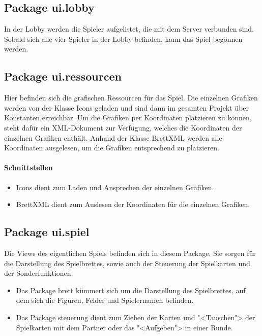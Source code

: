\documentclass[12pt,halfparskip]{scrartcl}
\begin{document}
\subsection{Package ui.lobby}

In der Lobby werden die Spieler aufgelistet, die mit dem Server verbunden sind. Sobald sich alle vier Spieler in der Lobby befinden, kann das Spiel begonnen werden.

\subsection{Package ui.ressourcen}

Hier befinden sich die grafischen Ressourcen für das Spiel. Die einzelnen Grafiken werden von der Klasse Icons geladen und sind dann im gesamten Projekt über Konstanten erreichbar. Um die Grafiken per Koordinaten platzieren zu können, steht dafür ein XML-Dokument zur Verfügung, welches die Koordinaten der einzelnen Grafiken enthält. Anhand der Klasse BrettXML werden alle Koordinaten ausgelesen, um die Grafiken entsprechend zu platzieren.

\paragraph{Schnittstellen}
\begin{itemize}
	\item Icons dient zum Laden und Ansprechen der einzelnen Grafiken.
	\item BrettXML dient zum Auslesen der Koordinaten für die einzelnen Grafiken.
\end{itemize}

\subsection{Package ui.spiel}

Die Views des eigentlichen Spiels befinden sich in diesem Package. Sie sorgen für die Darstellung des Spielbrettes, sowie auch der Steuerung der Spielkarten und der Sonderfunktionen.

\begin{itemize}
	\item Das Package brett kümmert sich um die Darstellung des Spielbrettes, auf dem sich die Figuren, Felder und Spielernamen befinden.
	\item Das Package steuerung dient zum Ziehen der Karten und "<Tauschen"> der Spielkarten mit dem Partner oder das "<Aufgeben"> in einer Runde.
\end{itemize}
\end{document}
